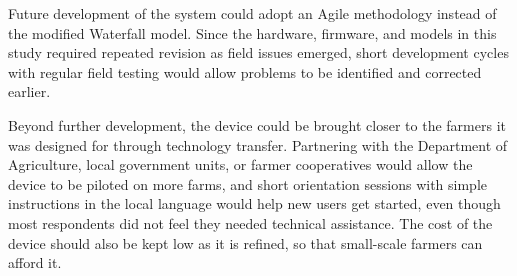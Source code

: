 \begin{thesisprose}
Future development of the system could adopt an Agile methodology instead of the modified Waterfall model. Since the hardware, firmware, and models in this study required repeated revision as field issues emerged, short development cycles with regular field testing would allow problems to be identified and corrected earlier.

Beyond further development, the device could be brought closer to the farmers it was designed for through technology transfer. Partnering with the Department of Agriculture, local government units, or farmer cooperatives would allow the device to be piloted on more farms, and short orientation sessions with simple instructions in the local language would help new users get started, even though most respondents did not feel they needed technical assistance. The cost of the device should also be kept low as it is refined, so that small-scale farmers can afford it.

\end{thesisprose}